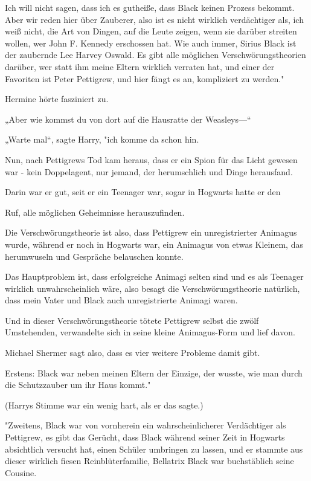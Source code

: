 {Ich will nicht sagen, dass ich es gutheiße, dass Black keinen Prozess bekommt. Aber wir reden hier über Zauberer, also ist es nicht wirklich verdächtiger als, ich weiß nicht, die Art von Dingen, auf die Leute zeigen, wenn sie darüber streiten wollen, wer John F. Kennedy erschossen hat. Wie auch immer, Sirius Black ist der zaubernde Lee Harvey Oswald. Es gibt alle möglichen Verschwörungstheorien darüber, wer statt ihm meine Eltern wirklich verraten hat, und einer der Favoriten ist Peter Pettigrew, und hier fängt es an, kompliziert zu werden."

Hermine hörte fasziniert zu.

„Aber wie kommst du von dort auf die Hausratte der Weasleys—“

„Warte mal“, sagte Harry, "ich komme da schon hin.

Nun, nach Pettigrews Tod kam heraus, dass er ein Spion für das Licht gewesen war - kein Doppelagent, nur jemand, der herumschlich und Dinge herausfand.

Darin war er gut, seit er ein Teenager war, sogar in Hogwarts hatte er den

Ruf, alle möglichen Geheimnisse herauszufinden.

Die Verschwörungstheorie ist also, dass Pettigrew ein unregistrierter Animagus wurde, während er noch in Hogwarts war, ein Animagus von etwas Kleinem, das herumwuseln und Gespräche belauschen konnte.

Das Hauptproblem ist, dass erfolgreiche Animagi selten sind und es als Teenager wirklich unwahrscheinlich wäre, also besagt die Verschwörungstheorie natürlich, dass mein Vater und Black auch unregistrierte Animagi waren.

Und in dieser Verschwörungstheorie tötete Pettigrew selbst die zwölf Umstehenden, verwandelte sich in seine kleine Animagus-Form und lief davon.

Michael Shermer sagt also, dass es vier weitere Probleme damit gibt.

Erstens: Black war neben meinen Eltern der Einzige, der wusste, wie man durch die Schutzzauber um ihr Haus kommt."

(Harrys Stimme war ein wenig hart, als er das sagte.)

"Zweitens, Black war von vornherein ein wahrscheinlicherer Verdächtiger als Pettigrew, es gibt das Gerücht, dass Black während seiner Zeit in Hogwarts absichtlich versucht hat, einen Schüler umbringen zu lassen, und er stammte aus dieser wirklich fiesen Reinblüterfamilie, Bellatrix Black war buchstäblich seine Cousine.

}
